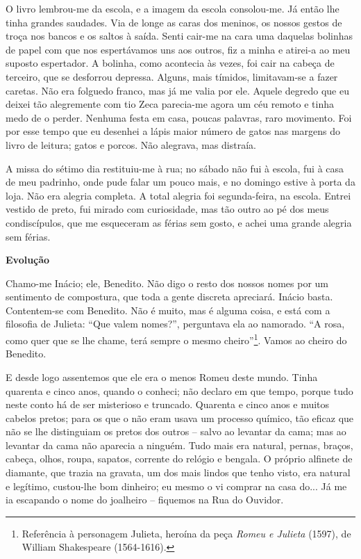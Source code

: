 O livro lembrou-me da escola, e a imagem da escola consolou-me. Já então
lhe tinha grandes saudades. Via de longe as caras dos meninos, os nossos
gestos de troça nos bancos e os saltos à saída. Senti cair-me na cara
uma daquelas bolinhas de papel com que nos espertávamos uns aos outros,
fiz a minha e atirei-a ao meu suposto espertador. A bolinha, como
acontecia às vezes, foi cair na cabeça de terceiro, que se desforrou
depressa. Alguns, mais tímidos, limitavam-se a fazer caretas. Não era
folguedo franco, mas já me valia por ele. Aquele degredo que eu deixei
tão alegremente com tio Zeca parecia-me agora um céu remoto e tinha medo
de o perder. Nenhuma festa em casa, poucas palavras, raro movimento. Foi
por esse tempo que eu desenhei a lápis maior número de gatos nas margens
do livro de leitura; gatos e porcos. Não alegrava, mas distraía.

A missa do sétimo dia restituiu-me à rua; no sábado não fui à escola,
fui à casa de meu padrinho, onde pude falar um pouco mais, e no domingo
estive à porta da loja. Não era alegria completa. A total alegria foi
segunda-feira, na escola. Entrei vestido de preto, fui mirado com
curiosidade, mas tão outro ao pé dos meus condiscípulos, que me
esqueceram as férias sem gosto, e achei uma grande alegria sem férias.

\textbf{Evolução}

Chamo-me Inácio; ele, Benedito. Não digo o resto dos nossos nomes por um
sentimento de compostura, que toda a gente discreta apreciará. Inácio
basta. Contentem-se com Benedito. Não é muito, mas é alguma coisa, e
está com a filosofia de Julieta: ``Que valem nomes?'', perguntava ela ao
namorado. ``A rosa, como quer que se lhe chame, terá sempre o mesmo
cheiro''\footnote{Referência à personagem Julieta, heroína da peça
  \emph{Romeu e Julieta} (1597), de William Shakespeare (1564-1616).}.
Vamos ao cheiro do Benedito.

E desde logo assentemos que ele era o menos Romeu deste mundo. Tinha
quarenta e cinco anos, quando o conheci; não declaro em que tempo,
porque tudo neste conto há de ser misterioso e truncado. Quarenta e
cinco anos e muitos cabelos pretos; para os que o não eram usava um
processo químico, tão eficaz que não se lhe distinguiam os pretos dos
outros -- salvo ao levantar da cama; mas ao levantar da cama não
aparecia a ninguém. Tudo mais era natural, pernas, braços, cabeça,
olhos, roupa, sapatos, corrente do relógio e bengala. O próprio alfinete
de diamante, que trazia na gravata, um dos mais lindos que tenho visto,
era natural e legítimo, custou-lhe bom dinheiro; eu mesmo o vi comprar
na casa do... Já me ia escapando o nome do joalheiro -- fiquemos na Rua
do Ouvidor.

